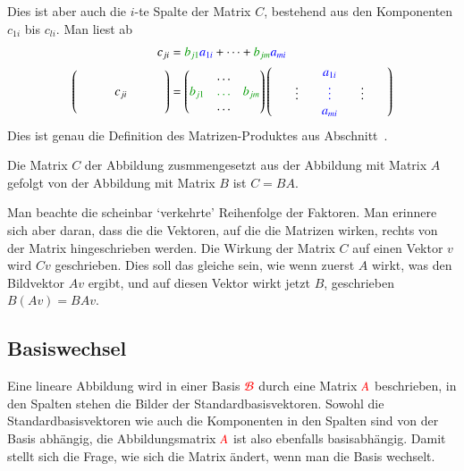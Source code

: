 Dies ist aber auch die $i$-te Spalte der Matrix $C$, bestehend aus den
Komponenten $c_{1i}$ bis $c_{li}$.
Man liest ab
{
\begin{align*}
c_{ji}
&=
{\color{darkgreen}b_{j1}}{\color{blue}a_{1i}} + \dots
	+ {\color{darkgreen}b_{jm}}{\color{blue}a_{mi}}
\\
\begin{pmatrix}
\qquad&\quad&\qquad\\
\qquad&c_{ji}&\qquad\\
\qquad&\quad&\qquad\\
\end{pmatrix}
&=
\begin{pmatrix}
&\dots&\\
\color{darkgreen}b_{j1}&\color{darkgreen}\dots&\color{darkgreen}b_{jm}\\
&\dots&
\end{pmatrix}
\begin{pmatrix}
&\qquad&\color{blue}a_{1i}&\qquad&\\
&\vdots&\color{blue}\vdots&\vdots&\\
&     &\color{blue}a_{mi}&&
\end{pmatrix}
\end{align*}
}
Dies ist genau die Definition des Matrizen-Produktes aus
Abschnitt~\label{skript:subsection:matrizen}.

\begin{satz}
Die Matrix $C$ der Abbildung zusmmengesetzt aus der Abbildung
mit Matrix $A$ gefolgt von der Abbildung mit Matrix $B$ ist
$C=BA$.
\end{satz}

Man beachte die scheinbar `verkehrte' Reihenfolge der Faktoren.
Man erinnere sich aber daran, dass die die Vektoren, auf die die Matrizen
wirken, rechts von der Matrix hingeschrieben werden.
Die Wirkung der Matrix $C$ auf einen Vektor $v$ wird $Cv$ geschrieben.
Dies soll das gleiche sein, wie wenn zuerst $A$ wirkt, was den Bildvektor
$Av$ ergibt, und auf diesen Vektor wirkt jetzt $B$, geschrieben $B(Av)=BAv$.

%
%
\subsection{Basiswechsel}
Eine lineare Abbildung wird in einer Basis $\color{red}\mathcal{B}$ durch
eine Matrix $\color{red}A$ beschrieben, in den Spalten stehen die Bilder
der Standardbasisvektoren.
Sowohl die Standardbasisvektoren wie auch die Komponenten in den
Spalten sind von der Basis abhängig, die Abbildungsmatrix $\color{red}A$
ist also ebenfalls basisabhängig.
Damit stellt sich die Frage, wie sich die Matrix ändert, wenn
man die Basis wechselt.

